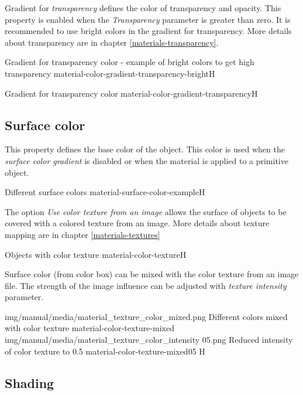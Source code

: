 Gradient for \emph{transparency} defines the color of transparency and opacity. This property is enabled when the \emph{Transparency} parameter is greater than zero. 
It is recommended to use bright colors in the gradient for transparency. More details about transparency are in chapter \ref{materials-transparency}.

{Gradient for transparency color - example of bright colors to get high transparency}
{material-color-gradient-transparency-bright}{H}

{Gradient for transparency color}
{material-color-gradient-transparency}{H}

\pagebreak
\subsection{Surface color}\label{materials-surface_color}

This property defines the base color of the object. This color is used when the \emph{surface color gradient} is disabled or when the material is applied to a primitive object.

{Different surface colors}
{material-surface-color-example}{H}

The option \emph{Use color texture from an image} allows the surface of objects to be covered with a colored texture from an image. More details about texture mapping are in chapter \ref{materials-textures}

{Objects with color texture}
{material-color-texture}{H}

Surface color (from color box) can be mixed with the color texture from an image file. The strength of the image influence can be adjusted with \emph{texture intensity} parameter.

\twoImagesWithTwoCaptionsFullWidth
{img/manual/media/material_texture_color_mixed.png}
{Different colors mixed with color texture}
{material-color-texture-mixed}
{img/manual/media/material_texture_color_intensity 05.png}
{Reduced intensity of color texture to 0.5}
{material-color-texture-mixed05}
{H}

\subsection{Shading}\label{materials-shading}

